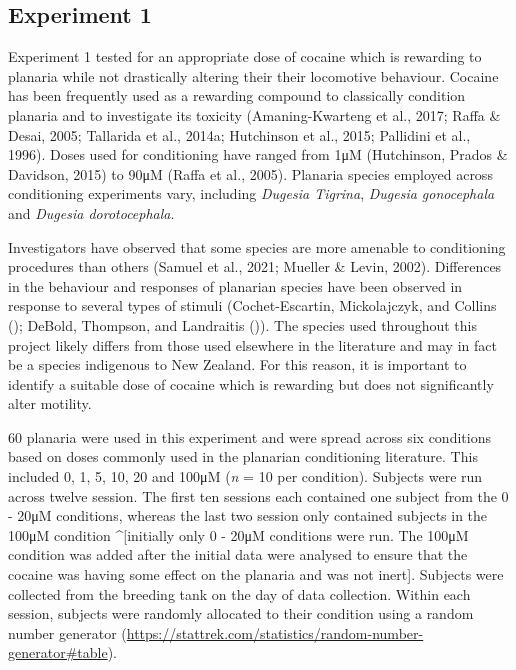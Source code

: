 \documentclass[
  letterpaper,
  DIV=11,
  numbers=noendperiod,
  oneside]{scrartcl}
\begin{document}
\subsection{Experiment 1}\label{experiment-1}

Experiment 1 tested for an appropriate dose of cocaine which is
rewarding to planaria while not drastically altering their their
locomotive behaviour. Cocaine has been frequently used as a rewarding
compound to classically condition planaria and to investigate its
toxicity (Amaning-Kwarteng et al., 2017; Raffa \& Desai, 2005; Tallarida
et al., 2014a; Hutchinson et al., 2015; Pallidini et al., 1996). Doses
used for conditioning have ranged from 1μM (Hutchinson, Prados \&
Davidson, 2015) to 90μM (Raffa et al., 2005). Planaria species employed
across conditioning experiments vary, including \emph{Dugesia Tigrina},
\emph{Dugesia gonocephala} and \emph{Dugesia dorotocephala}.

Investigators have observed that some species are more amenable to
conditioning procedures than others (Samuel et al., 2021; Mueller \&
Levin, 2002). Differences in the behaviour and responses of planarian
species have been observed in response to several types of stimuli
(Cochet-Escartin, Mickolajczyk, and Collins
(); DeBold, Thompson, and
Landraitis ()). The species used
throughout this project likely differs from those used elsewhere in the
literature and may in fact be a species indigenous to New Zealand. For
this reason, it is important to identify a suitable dose of cocaine
which is rewarding but does not significantly alter motility.

60 planaria were used in this experiment and were spread across six
conditions based on doses commonly used in the planarian conditioning
literature. This included 0, 1, 5, 10, 20 and 100μM (\emph{n} = 10 per
condition). Subjects were run across twelve session. The first ten
sessions each contained one subject from the 0 - 20μM conditions,
whereas the last two session only contained subjects in the 100μM
condition \^{}{[}initially only 0 - 20μM conditions were run. The 100μM
condition was added after the initial data were analysed to ensure that
the cocaine was having some effect on the planaria and was not inert{]}.
Subjects were collected from the breeding tank on the day of data
collection. Within each session, subjects were randomly allocated to
their condition using a random number generator
(\url{https://stattrek.com/statistics/random-number-generator\#table}).
\end{document}
